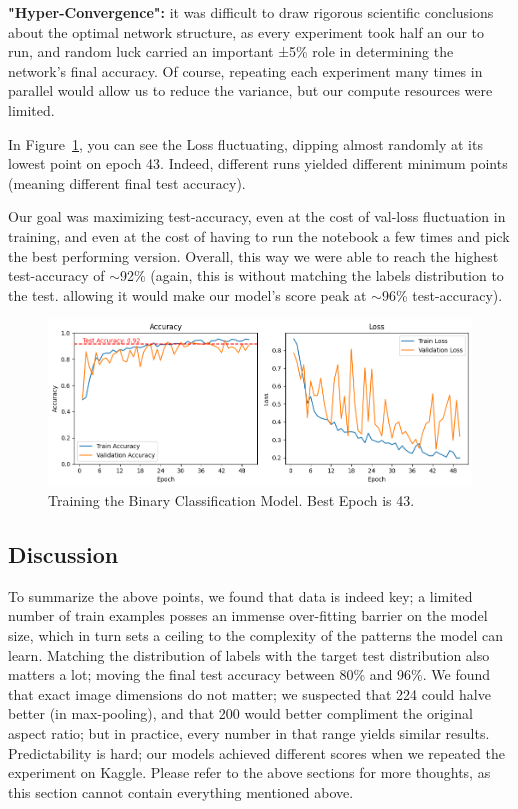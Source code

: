 \documentclass{article}
\begin{document}
\textbf{"Hyper-Convergence":} it was difficult to draw rigorous scientific conclusions about the optimal network structure, as every experiment took half an our to run, and random luck carried an important ±5\% role in determining the network's final accuracy. Of course, repeating each experiment many times in parallel would allow us to reduce the variance, but our compute resources were limited.

In Figure~\ref{fig:model_1_history}, you can see the Loss fluctuating, dipping almost randomly at its lowest point on epoch 43. Indeed, different runs yielded different minimum points (meaning different final test accuracy). 

Our goal was maximizing test-accuracy, even at the cost of val-loss fluctuation in training, and even at the cost of having to run the notebook a few times and pick the best performing version. Overall, this way we were able to reach the highest test-accuracy of $\sim$92\% (again, this is without matching the labels distribution to the test. allowing it would make our model's score peak at $\sim$96\% test-accuracy).


\begin{figure}[H]
    \centering
    \includegraphics[width=1\linewidth]{model_1_history.png}
    \caption{Training the Binary Classification Model. Best Epoch is 43.}
    \label{fig:model_1_history}
\end{figure}

\subsection{Discussion}
To summarize the above points, we found that data is indeed key; a limited number of train examples posses an immense over-fitting barrier on the model size, which in turn sets a ceiling to the complexity of the patterns the model can learn. Matching the distribution of labels with the target test distribution also matters a lot; moving the final test accuracy between 80\% and 96\%. We found that exact image dimensions do not matter; we suspected that 224 could halve better (in max-pooling), and that 200 would better compliment the original aspect ratio; but in practice, every number in that range yields similar results. Predictability is hard; our models achieved different scores when we repeated the experiment on Kaggle. Please refer to the above sections for more thoughts, as this section cannot contain everything mentioned above.
\end{document}
